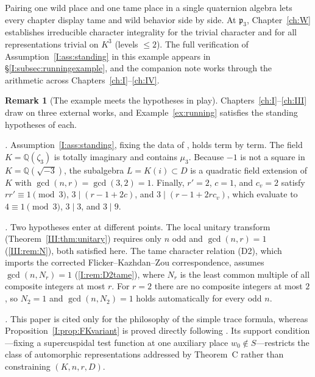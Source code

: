 \documentclass[12pt,letterpaper,oneside]{book}
\theoremstyle{plain}
\theoremstyle{definition}
\newtheorem{remark}[theorem]{Remark}
\begin{document}
Pairing one wild place and one tame place in a single quaternion algebra lets every chapter display tame and wild behavior side by side. At $\mathfrak p_3$, Chapter~\ref{ch:W} establishes irreducible character integrality for the trivial character and for all representations trivial on $K^3$ (levels $\le 2$). The full verification of Assumption~\ref{I:ass:standing} in this example appears in \S\ref{I:subsec:runningexample}, and the companion note \cite{JC26b} works through the arithmetic across Chapters~\ref{ch:I}--\ref{ch:IV}.

\begin{remark}[The example meets the hypotheses in play]\label{rem:running-hyp}
Chapters~\ref{ch:I}--\ref{ch:III} draw on three external works, and Example~\ref{ex:running} satisfies the standing hypotheses of each.

\emph{\cite{JC26a}.} Assumption~\ref{I:ass:standing}, fixing the data of \cite[\S1]{JC26a}, holds term by term. The field $K=\mathbb Q(\zeta_3)$ is totally imaginary and contains $\mu_3$. Because $-1$ is not a square in $K=\mathbb Q(\sqrt{-3})$, the subalgebra $L=K(i)\subset D$ is a quadratic field extension of $K$ with $\gcd(n,r)=\gcd(3,2)=1$. Finally, $r'=2$, $c=1$, and $c_v=2$ satisfy $rr'\equiv 1\pmod 3$, $3\mid (r-1+2c)$, and $3\mid (r-1+2rc_v)$, which evaluate to $4\equiv 1\pmod 3$, $3\mid 3$, and $3\mid 9$.

\emph{\cite{FK86}.} Two hypotheses enter at different points. The local unitary transform (Theorem~\ref{III:thm:unitary}) requires only $n$ odd and $\gcd(n,r)=1$ (\cref{III:rem:N}), both satisfied here. The tame character relation (D2), which imports the corrected Flicker--Kazhdan--Zou correspondence, assumes $\gcd(n,N_r)=1$ (\cref{I:rem:D2tame}), where $N_r$ is the least common multiple of all composite integers at most $r$. For $r=2$ there are no composite integers at most $2$, so $N_2=1$ and $\gcd(n,N_2)=1$ holds automatically for every odd $n$.

\emph{\cite{FK88}.} This paper is cited only for the philosophy of the simple trace formula, whereas Proposition~\ref{I:prop:FKvariant} is proved directly following \cite[\S18]{FK86}. Its support condition---fixing a supercuspidal test function at one auxiliary place $w_0\notin S$---restricts the class of automorphic representations addressed by Theorem~C rather than constraining $(K,n,r,D)$.
\end{remark}
\end{document}
